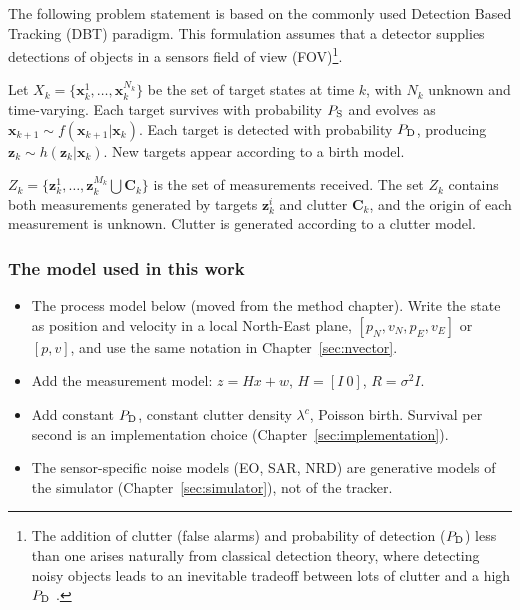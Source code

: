 The following problem statement is based on the commonly used Detection Based Tracking (DBT) paradigm. This formulation assumes that a detector supplies detections of objects in a sensors field of view (FOV)\footnote{The addition of clutter (false alarms) and probability of detection ($P_{\mathrm{D}}$) less than one arises naturally from classical detection theory, where detecting noisy objects leads to an inevitable tradeoff between lots of clutter and a high $P_{\mathrm{D}}$ \cite{detection_theory}.}.
\medskip

Let $X_k=\{\mathbf{x}_k^{1},\dots,\mathbf{x}_k^{N_k}\}$ be the set of target states at time $k$, with $N_k$ unknown and time-varying. Each target survives with probability $P_{\mathrm{S}}$ and evolves as $\mathbf{x}_{k+1} \sim f(\mathbf{x}_{k+1} \vert \mathbf{x}_k)$. Each target is detected with probability $P_{\mathrm{D}}$, producing $\mathbf{z}_k \sim h(\mathbf{z}_k \vert \mathbf{x}_k)$. New targets appear according to a birth model. 
\medskip

$Z_k = \{\mathbf{z}_k^{1},\dots,\mathbf{z}_k^{M_k} \bigcup \mathbf{C}_k\}$ is the set of measurements received.
The set $Z_k$ contains both measurements generated by targets $\mathbf{z}_k^i$ and clutter $\mathbf{C}_k$, and the origin of each measurement is unknown. Clutter is generated according to a clutter model.

\subsubsection{The model used in this work}
\label{sec:model-this-work}
\begin{itemize}
    \item The process model below (moved from the method chapter). Write the state as position and velocity in a local North-East plane, $[p_N, v_N, p_E, v_E]$ or $[p, v]$, and use the same notation in Chapter~\ref{sec:nvector}.
    \item Add the measurement model: $z = Hx + w$, $H = [I\ 0]$, $R = \sigma^2 I$.
    \item Add constant $P_{\mathrm{D}}$, constant clutter density $\lambda^c$, Poisson birth. Survival per second is an implementation choice (Chapter~\ref{sec:implementation}).
    \item The sensor-specific noise models (EO, SAR, NRD) are generative models of the simulator (Chapter~\ref{sec:simulator}), not of the tracker.
\end{itemize}

